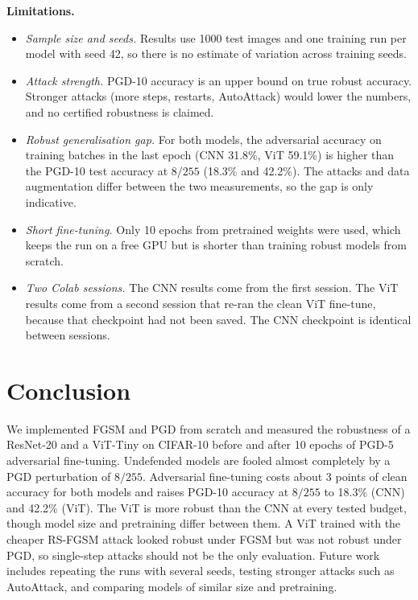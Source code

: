 \documentclass[a4paper,11pt]{article}
\begin{document}
\textbf{Limitations.}
\begin{itemize}
\item \emph{Sample size and seeds.} Results use 1000 test images and one
training run per model with seed 42, so there is no estimate of
variation across training seeds.
\item \emph{Attack strength.} PGD-10 accuracy is an upper bound on true
robust accuracy. Stronger attacks (more steps, restarts, AutoAttack)
would lower the numbers, and no certified robustness is claimed.
\item \emph{Robust generalisation gap.} For both models, the adversarial
accuracy on training batches in the last epoch (CNN 31.8\%, ViT 59.1\%)
is higher than the PGD-10 test accuracy at $8/255$ (18.3\% and 42.2\%).
The attacks and data augmentation differ between the two measurements, so
the gap is only indicative.
\item \emph{Short fine-tuning.} Only 10 epochs from pretrained weights
were used, which keeps the run on a free GPU but is shorter than
training robust models from scratch.
\item \emph{Two Colab sessions.} The CNN results come from the first
session. The ViT results come from a second session that re-ran the clean
ViT fine-tune, because that checkpoint had not been saved. The CNN
checkpoint is identical between sessions.
\end{itemize}

\section{Conclusion}

We implemented FGSM and PGD from scratch and measured the robustness of a
ResNet-20 and a ViT-Tiny on CIFAR-10 before and after 10 epochs of PGD-5
adversarial fine-tuning. Undefended models are fooled almost completely by
a PGD perturbation of $8/255$. Adversarial fine-tuning costs about 3
points of clean accuracy for both models and raises PGD-10 accuracy at
$8/255$ to 18.3\% (CNN) and 42.2\% (ViT). The ViT is more robust than the
CNN at every tested budget, though model size and pretraining differ
between them. A ViT trained with the cheaper RS-FGSM attack looked robust
under FGSM but was not robust under PGD, so single-step attacks should not
be the only evaluation. Future work includes repeating the runs with
several seeds, testing stronger attacks such as AutoAttack, and comparing
models of similar size and pretraining.
\end{document}
